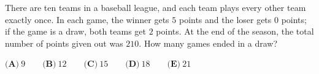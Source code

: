 There are ten teams in a baseball league, and each team plays every other team exactly once. In each game, the winner gets $5$ points and the loser gets $0$ points; if the game is a draw, both teams get $2$ points. At the end of the season, the total number of points given out was $210$. How many games ended in a draw?

$\textbf{(A)}\ 9\qquad\textbf{(B)}\ 12\qquad\textbf{(C)}\ 15\qquad\textbf{(D)}\ 18\qquad\textbf{(E)}\ 21$
